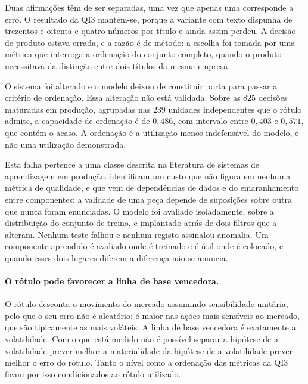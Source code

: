 Duas afirmações têm de ser separadas, uma vez que apenas uma corresponde a erro. O resultado da
\gls{QI}3 mantém-se, porque a variante com texto dispunha de trezentos e oitenta e quatro números
por título e ainda assim perdeu. A decisão de produto estava errada, e a razão é de método: a
escolha foi tomada por uma métrica que interroga a ordenação do conjunto completo, quando o produto
necessitava da distinção entre dois títulos da mesma empresa.

O sistema foi alterado e o modelo deixou de constituir porta para passar a critério de ordenação.
Essa alteração não está validada. Sobre as $825$ decisões maturadas em produção, agrupadas nas $239$
unidades independentes que o rótulo admite, a capacidade de ordenação é de $0{,}486$, com intervalo
entre $0{,}403$ e $0{,}571$, que contém o acaso. A ordenação é a utilização menos indefensável do
modelo, e não uma utilização demonstrada.

Esta falha pertence a uma classe descrita na literatura de sistemas de aprendizagem em produção.
\textcite{sculley2015debt} identificam um custo que não figura em nenhuma métrica de qualidade, e
que vem de dependências de dados e do emaranhamento entre componentes: a validade de uma peça
depende de suposições sobre outra que nunca foram enunciadas. O modelo foi avaliado isoladamente,
sobre a distribuição do conjunto de treino, e implantado atrás de dois filtros que a alteram. Nenhum
teste falhou e nenhum registo assinalou anomalia. Um componente aprendido é avaliado onde é treinado
e é útil onde é colocado, e quando esses dois lugares diferem a diferença não se anuncia.

\paragraph{O rótulo pode favorecer a linha de base vencedora.}
O rótulo desconta o movimento do mercado assumindo sensibilidade unitária, pelo que o seu erro não é
aleatório: é maior nas ações mais sensíveis ao mercado, que são tipicamente as mais voláteis. A
linha de base vencedora é exatamente a volatilidade. Com o que está medido não é possível separar a
hipótese de a volatilidade prever melhor a materialidade da hipótese de a volatilidade prever melhor
o erro do rótulo. Tanto o nível como a ordenação das métricas da \gls{QI}3 ficam por isso
condicionados ao rótulo utilizado.

